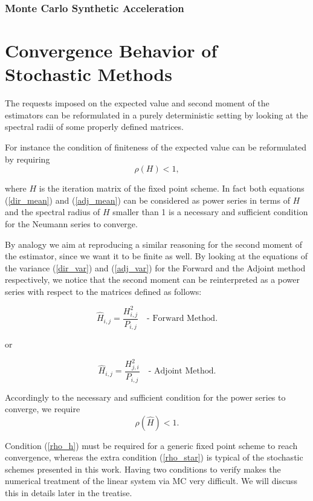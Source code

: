 \documentclass[a4paper,10pt]{article}
\begin{document}
\subsubsection{Monte Carlo Synthetic Acceleration}

\section{Convergence Behavior of Stochastic Methods}

The requests imposed on the expected value and second moment of the estimators
can be reformulated in a purely deterministic setting by looking at the
spectral radii of some properly defined matrices.

For instance the condition of finiteness of the expected value can be
reformulated by requiring
\begin{equation}
 \rho(H)<1
 \label{rho_h},
\end{equation}

where $H$ is the iteration matrix of the fixed point scheme.
In fact both equations (\ref{dir_mean}) and (\ref{adj_mean}) can be considered
as
power series in terms of $H$ and the spectral radius of $H$ smaller
than 1 is a necessary and sufficient condition for the Neumann series to
converge.


By analogy we aim at reproducing a similar reasoning for the second moment of
the estimator, since we want it to be finite as well.
By looking at the equations of the variance (\ref{dir_var}) and (\ref{adj_var})
for
the Forward and the Adjoint method respectively, we notice that the second
moment can be reinterpreted as a power series with respect to the matrices
defined as follows:

\[
 \hat{H}_{i,j}=\frac{H_{i,j}^2}{P_{i,j}} \quad \text{- Forward Method}.
\]

or

\[
 \hat{H}_{i,j}=\frac{H_{j,i}^2}{P_{i,j}} \quad \text{- Adjoint Method}.
\]


Accordingly to the necessary and sufficient condition for the power series to
converge, we require
\begin{equation}
 \rho(\hat{H})<1.
 \label{rho_star}
\end{equation}

Condition (\ref{rho_h}) must be required for a generic fixed point scheme to
reach convergence, whereas the extra condition (\ref{rho_star}) is typical of
the stochastic schemes presented in this work. Having two conditions to
verify makes the numerical treatment of the linear system via MC very
difficult. We will discuss this in details later in the treatise. \newline
\end{document}
